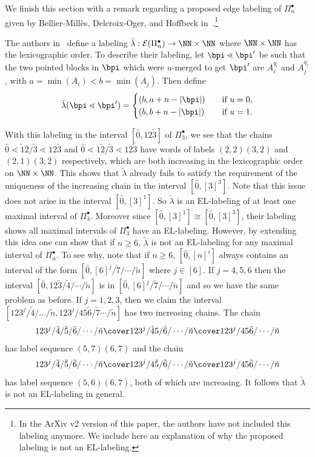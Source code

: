  
We finish this section with a remark regarding a proposed  edge labeling of $\Pi_n^\bullet$ given by Bellier-Mill{\`e}s, Delcroix-Oger, and Hoffbeck in~\cite {BelliermillesDelcroixogerHoffbeck2021}.\footnote{In the ArXiv v2 version of this paper, the authors have not included this labeling anymore. We include here an explanation of why the proposed labeling is not an EL-labeling.}


\begin{rema}\label{remark:proposed_EL_labeling} The authors in~\cite{BelliermillesDelcroixogerHoffbeck2021} define a labeling $\tilde \lambda:\mathcal{E}(\Pi_{n}^{\bullet})\rightarrow \NN\times \NN$ where  $\NN\times \NN$ has the lexicographic order. To describe their labeling, let $\bpi \lessdot \bpi'$ be such that the two pointed blocks in $\bpi$ which were $u$-merged to get $\bpi'$ are $A_i^{q_i}$ and $A_j^{q_j}$, with $a=\min(A_i)< b=\min(A_j)$. Then define 
$$\tilde \lambda(\bpi \lessdot \bpi')=  \begin{cases}
    (b,a+n-|\bpi|)       & \quad \text{if }u=0,\\
    (b,b+n-|\bpi|)  & \quad \text{if } u=1.
  \end{cases}$$
 
     With this labeling in the interval $[\hat{0},12\tilde{3}]$ of $\Pi_3^{\bullet}$, we see that the chains $\hat{0}\lessdot  \tilde{1}2/\tilde {3}\lessdot   12\tilde{3}$ and  $\hat{0}\lessdot 1\tilde{2}/ \tilde {3}\lessdot  12\tilde{3}$ have words of labels $(2,2)(3,2)$   and $(2,1)(3,2)$ respectively, which are both increasing in the lexicographic order on $\NN\times \NN$. This shows that $\tilde \lambda$ already fails to satisfy the requirement of the uniqueness of the increasing chain in the interval $[\hat{0},[3]^3]$.   Note that this issue does not arise in the interval $[\hat{0},[3]^1]$. So $\tilde \lambda$ is an EL-labeling of at least one maximal interval of $\Pi^{\bullet}_{3}$. Moreover since  $[\hat{0},[3]^1] \cong  [\hat{0},[3]^3]$,  their labeling shows all maximal intervals of $\Pi_{3}^\bullet$   have an EL-labeling.
     However, by extending this idea one can show that if $n\geq 6$, $\tilde \lambda$ is not an EL-labeling for any maximal interval of $\Pi_n^{\bullet}$.  To see why, note that if $n\geq 6$, $[\hat{0}, [n]^i]$ always contains an interval of the form $[\hat{0}, [6]^j/\tilde{7}/\cdots/ \tilde{n}]$ where $j\in [6]$.  If $j=4,5,6$ then the interval $[\hat{0}, 12\tilde{3}/\tilde{4}/\cdots/\tilde{n}]$   is in $[\hat{0}, [6]^j/\tilde{7}/\cdots/ \tilde{n}]$ and so we have the same problem as before. If $j=1,2,3$, then we claim the interval $[123^{j}/\tilde{4}/\dots /\tilde{n}, 123^j/45\tilde{6}/\tilde{7}\cdots/\tilde{n}]$ has two increasing chains.   The chain 
     $$
     123^{j}/\tilde{4}/\tilde{5}/\tilde{6}/\cdots /\tilde{n} \cover 123^{j}/\tilde{4}5/\tilde{6}/\cdots /\tilde{n} \cover 123^{j}/45\tilde{6}/\cdots /\tilde{n}
     $$
    has label sequence $(5,7)(6,7)$ and the chain
      $$
     123^{j}/\tilde{4}/\tilde{5}/\tilde{6}/\cdots /\tilde{n} \cover 123^{j}/4\tilde{5}/\tilde{6}/\cdots /\tilde{n} \cover 123^{j}/45\tilde{6}/\cdots /\tilde{n}
     $$
     has label sequence $(5,6)(6,7)$, both of which are increasing.  It follows that $\tilde \lambda$ is not an EL-labeling in general.
\end{rema}
